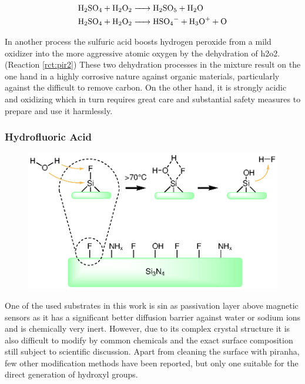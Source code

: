 \begin{align}
	\ce{H2SO4 + H2O2 &-> H2SO5 + H2O} \label{rct:pir1}\\
	\ce{H2SO4 + H2O2 &-> HSO4- + H3O+ + O} \label{rct:pir2}
\end{align}

In another process the sulfuric acid boosts hydrogen peroxide from a mild oxidizer into the more aggressive atomic oxygen by the dehydration of \gls{h2o2}. (Reaction \ref{rct:pir2})  These two dehydration processes in the mixture result on the one hand in a highly corrosive nature against organic materials, particularly against the difficult to remove carbon. On the other hand, it is strongly acidic and oxidizing which in turn requires great care and substantial safety measures to prepare and use it harmlessly.\clearpage

\subsubsection{Hydrofluoric Acid}
\begin{figure}
	\vspace{-1.35\baselineskip}
	\centering
	\includegraphics[width=1\linewidth]{Ressources/Chemistry/SiN}
	\label{fig:chem:func:sin}
\end{figure}
One of the used substrates in this work is \gls{sin} as passivation layer above magnetic sensors as it has a significant better diffusion barrier against water or sodium ions and is chemically very inert. \cite{lit:chem:sin:surface} However, due to its complex crystal structure it is also difficult to modify by common chemicals and the exact surface composition still subject to scientific discussion. \cite{lit:chem:sin:etchingcontrol} Apart from cleaning the surface with piranha, few other modification methods have been reported, but only one suitable for the direct generation of \gls{hydroxyl} groups.

